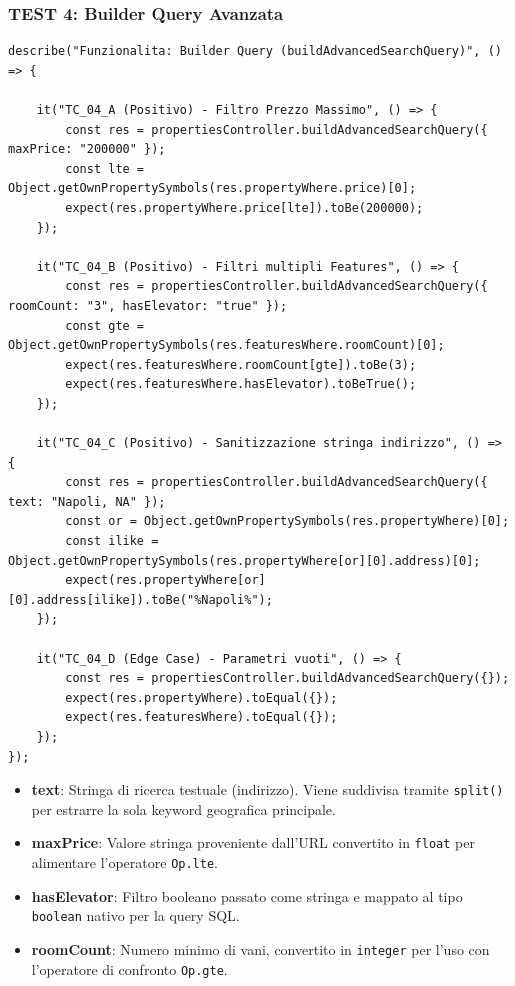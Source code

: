 \documentclass{article}
\begin{document}
\newpage

\subsubsection{TEST 4: Builder Query Avanzata}

\begin{lstlisting}[caption=Unit Test per la costruzione dinamica delle query Sequelize]
describe("Funzionalita: Builder Query (buildAdvancedSearchQuery)", () => {
    
    it("TC_04_A (Positivo) - Filtro Prezzo Massimo", () => {
        const res = propertiesController.buildAdvancedSearchQuery({ maxPrice: "200000" });
        const lte = Object.getOwnPropertySymbols(res.propertyWhere.price)[0];
        expect(res.propertyWhere.price[lte]).toBe(200000);
    });

    it("TC_04_B (Positivo) - Filtri multipli Features", () => {
        const res = propertiesController.buildAdvancedSearchQuery({ roomCount: "3", hasElevator: "true" });
        const gte = Object.getOwnPropertySymbols(res.featuresWhere.roomCount)[0];
        expect(res.featuresWhere.roomCount[gte]).toBe(3);
        expect(res.featuresWhere.hasElevator).toBeTrue();
    });

    it("TC_04_C (Positivo) - Sanitizzazione stringa indirizzo", () => {
        const res = propertiesController.buildAdvancedSearchQuery({ text: "Napoli, NA" });
        const or = Object.getOwnPropertySymbols(res.propertyWhere)[0];
        const ilike = Object.getOwnPropertySymbols(res.propertyWhere[or][0].address)[0];
        expect(res.propertyWhere[or][0].address[ilike]).toBe("%Napoli%");
    });

    it("TC_04_D (Edge Case) - Parametri vuoti", () => {
        const res = propertiesController.buildAdvancedSearchQuery({});
        expect(res.propertyWhere).toEqual({});
        expect(res.featuresWhere).toEqual({});
    });
});
\end{lstlisting}

\begin{itemize}
    \item \textbf{text}: Stringa di ricerca testuale (indirizzo). Viene suddivisa tramite \texttt{split()} per estrarre la sola keyword geografica principale.
    \item \textbf{maxPrice}: Valore stringa proveniente dall'URL convertito in \texttt{float} per alimentare l'operatore \texttt{Op.lte}.
    \item \textbf{hasElevator}: Filtro booleano passato come stringa e mappato al tipo \texttt{boolean} nativo per la query SQL.
    \item \textbf{roomCount}: Numero minimo di vani, convertito in \texttt{integer} per l'uso con l'operatore di confronto \texttt{Op.gte}.
\end{itemize}
\end{document}
